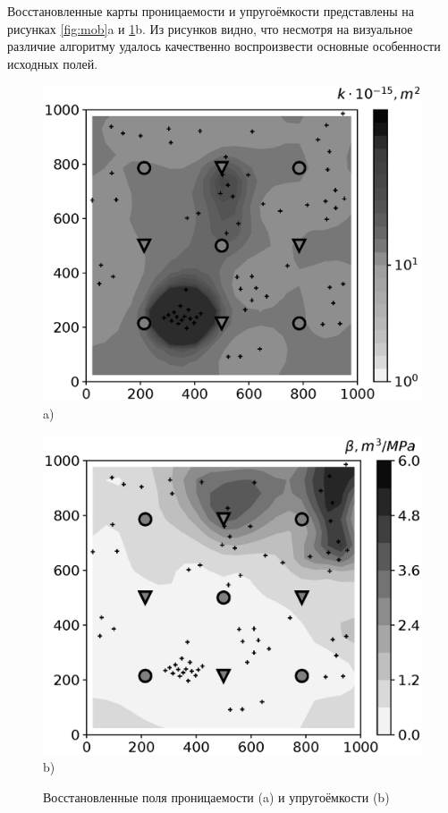 \documentclass{article}
\begin{document}
Восстановленные карты проницаемости и упругоёмкости представлены на рисунках \ref{fig:mob}a и \ref{fig:comp}b. Из рисунков видно, что несмотря на визуальное различие алгоритму удалось качественно воспроизвести основные особенности исходных полей. 

\begin{figure}
	\begin{minipage}[h]{0.48\linewidth}
		\centering
		\includegraphics[height=0.80\linewidth]{images/fig5a.eps}\\
		a)
		\label{fig:mob}
	\end{minipage} \hfill
	\begin{minipage}[h]{0.48\linewidth}
		\centering
		\includegraphics[height=0.80\linewidth]{images/fig5b.eps} \\
		b)
		\label{fig:comp}
	\end{minipage}
	\caption{Восстановленные поля проницаемости (a) и упругоёмкости (b)}
\end{figure}
\end{document}
